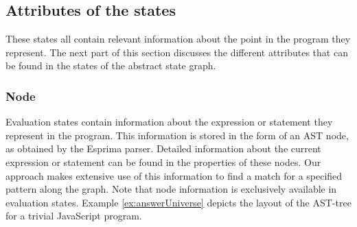 \subsection{Attributes of the states}
These states all contain relevant information about the point in the program they represent. The next part of this section discusses the different attributes that can be found in the states of the abstract state graph. 

\subsubsection*{Node}

Evaluation states contain information about the expression or statement they represent in the program. This information is stored in the form of an AST node, as obtained by the Esprima parser. Detailed information about the current expression or statement can be found in the properties of these nodes. Our approach makes extensive use of this information to find a match for a specified pattern along the graph. Note that node information is exclusively available in evaluation states. Example \ref{ex:answerUniverse} depicts the layout of the AST-tree for a trivial JavaScript program.

